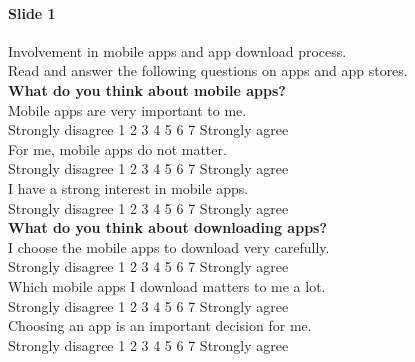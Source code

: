 \paragraph{Slide 1} Involvement in mobile apps and app download process.\\
Read and answer the following questions on apps and app stores.\\
\textbf{What do you think about mobile apps?}\\
Mobile apps are very important to me.\\
Strongly disagree {\huge \Square} 1  {\huge \Square} 2 {\huge \Square} 3 {\huge \Square} 4 {\huge \Square} 5 {\huge \Square} 6 {\huge \Square} 7 Strongly agree\\
For me, mobile apps do not matter.\\
Strongly disagree {\huge \Square} 1  {\huge \Square} 2 {\huge \Square} 3 {\huge \Square} 4 {\huge \Square} 5 {\huge \Square} 6 {\huge \Square} 7 Strongly agree\\
I have a strong interest in mobile apps.\\
Strongly disagree {\huge \Square} 1  {\huge \Square} 2 {\huge \Square} 3 {\huge \Square} 4 {\huge \Square} 5 {\huge \Square} 6 {\huge \Square} 7 Strongly agree\\
\textbf{What do you think about downloading apps?}\\
I choose the mobile apps to download very carefully.\\
Strongly disagree {\huge \Square} 1  {\huge \Square} 2 {\huge \Square} 3 {\huge \Square} 4 {\huge \Square} 5 {\huge \Square} 6 {\huge \Square} 7 Strongly agree\\
Which mobile apps I download matters to me a lot.\\
Strongly disagree {\huge \Square} 1  {\huge \Square} 2 {\huge \Square} 3 {\huge \Square} 4 {\huge \Square} 5 {\huge \Square} 6 {\huge \Square} 7 Strongly agree\\
Choosing an app is an important decision for me.\\
Strongly disagree {\huge \Square} 1  {\huge \Square} 2 {\huge \Square} 3 {\huge \Square} 4 {\huge \Square} 5 {\huge \Square} 6 {\huge \Square} 7 Strongly agree

